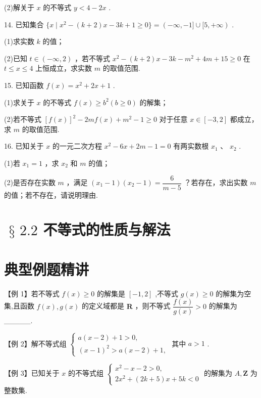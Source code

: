 (2)解关于 $x$ 的不等式 $y < 4 - {2x}$ .

14. 已知集合 $\{ x \mid  {x}^{2} - \left( {k + 2}\right) x - {3k} + 1 \geq  0\}  = \left( {-\infty , - 1\rbrack \cup \lbrack 5, + \infty }\right)$ .

(1)求实数 $k$ 的值；

(2)已知 $t \in  \left( {-\infty ,2}\right)$ ，若不等式 ${x}^{2} - \left( {k + 2}\right) x - {3k} - {m}^{2} + {4m} + {15} \geq  0$ 在 $t \leq  x \leq  4$ 上恒成立，求实数 $m$ 的取值范围.

15. 已知函数 $f\left( x\right)  = {x}^{2} + {2x} + 1$ .

(1)求关于 $x$ 的不等式 $f\left( x\right)  \geq  {b}^{2}\left( {b \geq  0}\right)$ 的解集；

(2)若不等式 ${\left\lbrack  f\left( x\right) \right\rbrack  }^{2} - {2mf}\left( x\right)  + {m}^{2} - 1 \geq  0$ 对于任意 $x \in  \left\lbrack  {-3,2}\right\rbrack$ 都成立，求 $m$ 的取值范围.

16. 已知关于 $x$ 的一元二次方程 ${x}^{2} - {6x} + {2m} - 1 = 0$ 有两实数根 ${x}_{1}$ 、 ${x}_{2}$ .

(1)若 ${x}_{1} = 1$ ，求 ${x}_{2}$ 和 $m$ 的值；

(2)是否存在实数 $m$ ，满足 $\left( {{x}_{1} - 1}\right) \left( {{x}_{2} - 1}\right)  = \dfrac{6}{m - 5}$ ？若存在，求出实数 $m$ 的值；若不存在，请说明理由.

\section*{$\text{ § }{2.2}$ 不等式的性质与解法}

\section*{典型例题精讲}

【例 1】若不等式 $f\left( x\right)  \geq  0$ 的解集是 $\left\lbrack  {-1,2}\right\rbrack$ ,不等式 $g\left( x\right)  \geq  0$ 的解集为空集,且函数 $f\left( x\right) ,g\left( x\right)$ 的定义域都是 $\mathbf{R}$ ，则不等式 $\dfrac{f\left( x\right) }{g\left( x\right) } > 0$ 的解集为\_\_\_\_\_.

【例 2】解不等式组 $\left\{  \begin{array}{l} a\left( {x - 2}\right)  + 1 > 0, \\  {\left( x - 1\right) }^{2} > a\left( {x - 2}\right)  + 1, \end{array}\right.$ 其中 $a > 1$ .

【例 3】已知关于 $x$ 的不等式组 $\left\{  \begin{array}{l} {x}^{2} - x - 2 > 0, \\  2{x}^{2} + \left( {{2k} + 5}\right) x + {5k} < 0 \end{array}\right.$ 的解集为 $A,\mathbf{Z}$ 为整数集.

